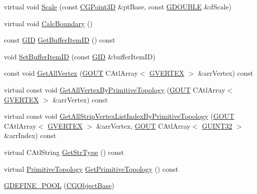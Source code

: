 \begin{DoxyCompactItemize}
\item 
virtual void \hyperlink{class_c_g_object_base_abb41464e473e673693d9cc471c4efb7c}{Scale} (const \hyperlink{class_c_g_point3_d}{C\+G\+Point3\+D} \&pt\+Base, const \hyperlink{_g_types_8h_afd05ac85f90ee8e2a733928545462cd4}{G\+D\+O\+U\+B\+L\+E} \&d\+Scale)
\item 
virtual void \hyperlink{class_c_g_object_base_a9e85d6655f30b79aa434a8ad55e51371}{Calc\+Boundary} ()
\item 
const \hyperlink{_g_types_8h_a5b96ecb16d8e437977d12cd40aa6f6d8}{G\+I\+D} \hyperlink{class_c_g_object_base_a14b8b162c3bac106e3d87f5f99d3885d}{Get\+Buffer\+Item\+I\+D} () const 
\item 
void \hyperlink{class_c_g_object_base_a11c66c9b2b69a8768c337e5ac1750399}{Set\+Buffer\+Item\+I\+D} (const \hyperlink{_g_types_8h_a5b96ecb16d8e437977d12cd40aa6f6d8}{G\+I\+D} \&buffer\+Item\+I\+D)
\item 
const void \hyperlink{class_c_g_object_base_ae2035e2dcf6e667409fa3f80981b7c8a}{Get\+All\+Vertex} (\hyperlink{_g_types_8h_a0858ec221262e635612871d70ca233ad}{G\+O\+U\+T} C\+Atl\+Array$<$ \hyperlink{struct_g_v_e_r_t_e_x}{G\+V\+E\+R\+T\+E\+X} $>$ \&arr\+Vertex) const 
\item 
virtual const void \hyperlink{class_c_g_object_base_a8191037be2e80b9b39217bc9c32834c5}{Get\+All\+Vertex\+By\+Primitive\+Topology} (\hyperlink{_g_types_8h_a0858ec221262e635612871d70ca233ad}{G\+O\+U\+T} C\+Atl\+Array$<$ \hyperlink{struct_g_v_e_r_t_e_x}{G\+V\+E\+R\+T\+E\+X} $>$ \&arr\+Vertex) const 
\item 
virtual const void \hyperlink{class_c_g_object_base_a0f72743afd6f673274209f36651cf978}{Get\+All\+Strip\+Vertex\+List\+Index\+By\+Primitive\+Topology} (\hyperlink{_g_types_8h_a0858ec221262e635612871d70ca233ad}{G\+O\+U\+T} C\+Atl\+Array$<$ \hyperlink{struct_g_v_e_r_t_e_x}{G\+V\+E\+R\+T\+E\+X} $>$ \&arr\+Vertex, \hyperlink{_g_types_8h_a0858ec221262e635612871d70ca233ad}{G\+O\+U\+T} C\+Atl\+Array$<$ \hyperlink{_g_types_8h_a2e1a1c77d1349057202e2f34e071019c}{G\+U\+I\+N\+T32} $>$ \&arr\+Index) const 
\item 
virtual C\+Atl\+String \hyperlink{class_c_g_object_base_a661df83e98eb60ed3f87609c110c4c6b}{Get\+Str\+Type} () const 
\item 
virtual \hyperlink{_g_types_8h_a940e3da6a9b57aae3de0b050e2a7af5e}{Primitive\+Topology} \hyperlink{class_c_g_object_base_ad0092032844236a27523dcb99c6ce684}{Get\+Primitive\+Topology} () const 
\item 
\hyperlink{class_c_g_object_base_aa887fd0f2d03baa733a1320ecd33df59}{G\+D\+E\+F\+I\+N\+E\+\_\+\+P\+O\+O\+L} (\hyperlink{class_c_g_object_base}{C\+G\+Object\+Base})

\end{DoxyCompactItemize}
